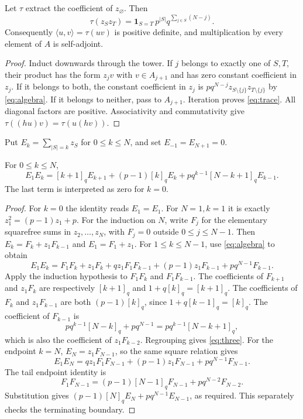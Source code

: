 \begin{lemma}\label{lem:trace}
Let $\tau$ extract the coefficient of $z_\varnothing$. Then
\begin{equation}\label{eq:trace}
\tau(z_Sz_T)=\boldsymbol1_{S=T}\,p^{|S|}q^{\sum_{j\in S}(N-j)}.
\end{equation}
Consequently $\langle u,v\rangle=\tau(uv)$ is positive definite, and multiplication by every element of $A$ is self-adjoint.
\end{lemma}
\begin{proof}
Induct downwards through the tower. If $j$ belongs to exactly one of $S,T$, their product has the form $z_jv$ with $v\in A_{j+1}$ and has zero constant coefficient in $z_j$. If it belongs to both, the constant coefficient in $z_j$ is $pq^{N-j}z_{S\setminus\{j\}}z_{T\setminus\{j\}}$ by \eqref{eq:algebra}. If it belongs to neither, pass to $A_{j+1}$. Iteration proves \eqref{eq:trace}. All diagonal factors are positive. Associativity and commutativity give $\tau((hu)v)=\tau(u(hv))$.
\end{proof}

Put $E_k=\sum_{|S|=k}z_S$ for $0\leq k\leq N$, and set $E_{-1}=E_{N+1}=0$.

\begin{lemma}\label{lem:three}
For $0\leq k\leq N$,
\begin{equation}\label{eq:three}
E_1E_k=[k+1]_qE_{k+1}+(p-1)[k]_qE_k+
pq^{k-1}[N-k+1]_qE_{k-1}.
\end{equation}
The last term is interpreted as zero for $k=0$.
\end{lemma}
\begin{proof}
For $k=0$ the identity reads $E_1=E_1$. For $N=1,k=1$ it is exactly $z_1^2=(p-1)z_1+p$.
For the induction on $N$, write $F_j$ for the elementary squarefree sums in $z_2,\ldots,z_N$, with $F_j=0$ outside $0\leq j\leq N-1$. Then $E_k=F_k+z_1F_{k-1}$ and $E_1=F_1+z_1$. For $1\leq k\leq N-1$, use \eqref{eq:algebra} to obtain
\[
E_1E_k=F_1F_k+z_1F_k+qz_1F_1F_{k-1}
 +(p-1)z_1F_{k-1}+pq^{N-1}F_{k-1}.
\]
Apply the induction hypothesis to $F_1F_k$ and $F_1F_{k-1}$. The coefficients of $F_{k+1}$ and $z_1F_k$ are respectively $[k+1]_q$ and $1+q[k]_q=[k+1]_q$. The coefficients of $F_k$ and $z_1F_{k-1}$ are both $(p-1)[k]_q$, since $1+q[k-1]_q=[k]_q$. The coefficient of $F_{k-1}$ is
\[
pq^{k-1}[N-k]_q+pq^{N-1}=pq^{k-1}[N-k+1]_q,
\]
which is also the coefficient of $z_1F_{k-2}$. Regrouping gives \eqref{eq:three}.
For the endpoint $k=N$, $E_N=z_1F_{N-1}$, so the same square relation gives
\[
E_1E_N=qz_1F_1F_{N-1}+(p-1)z_1F_{N-1}+pq^{N-1}F_{N-1}.
\]
The tail endpoint identity is
\[
F_1F_{N-1}=(p-1)[N-1]_qF_{N-1}+pq^{N-2}F_{N-2}.
\]
Substitution gives $(p-1)[N]_qE_N+pq^{N-1}E_{N-1}$, as required. This separately checks the terminating boundary.
\end{proof}

